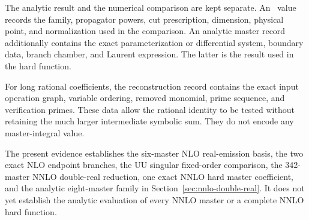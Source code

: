 The analytic result and the numerical comparison are kept separate.  An
\AMFlow\ value records the family, propagator powers, cut prescription,
dimension, physical point, and normalization used in the comparison.  An
analytic master record additionally contains the exact parameterization or
differential system, boundary data, branch chamber, and Laurent expression.
The latter is the result used in the hard function.

For long rational coefficients, the reconstruction record contains the exact
input operation graph, variable ordering, removed monomial, prime sequence,
and verification primes.  These data allow the rational identity to be tested
without retaining the much larger intermediate symbolic sum.  They do not
encode any master-integral value.

The present evidence establishes the six-master NLO real-emission basis, the
two exact NLO endpoint branches, the UU singular fixed-order comparison, the
342-master NNLO double-real reduction, one exact NNLO hard master coefficient,
and the analytic eight-master family in
Section~\ref{sec:nnlo-double-real}.  It does not yet establish the analytic
evaluation of every NNLO master or a complete NNLO hard function.
